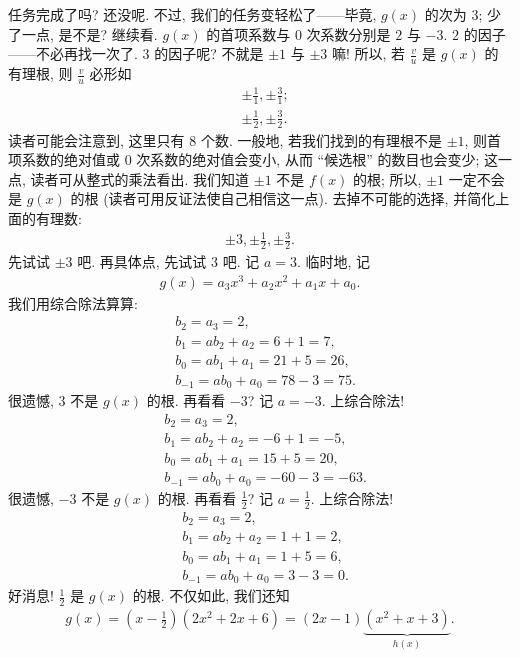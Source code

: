 \begin{example}
    任务完成了吗? 还没呢. 不过, 我们的任务变轻松了——毕竟, $g(x)$ 的次为 $3$; 少了一点, 是不是? 继续看. $g(x)$ 的首项系数与 $0$ 次系数分别是 $2$ 与 $-3$. $2$ 的因子——不必再找一次了. $3$ 的因子呢? 不就是 $\pm 1$ 与 $\pm 3$ 嘛! 所以, 若 $\frac{v}{u}$ 是 $g(x)$ 的有理根, 则 $\frac{v}{u}$ 必形如
    \begin{align*}
         & {\pm \frac{1}{1}}, {\pm \frac{3}{1}}; \\
         & {\pm \frac{1}{2}}, {\pm \frac{3}{2}}.
    \end{align*}
    读者可能会注意到, 这里只有 $8$ 个数. 一般地, 若我们找到的有理根不是 $\pm 1$, 则首项系数的绝对值或 $0$ 次系数的绝对值会变小, 从而 ``候选根'' 的数目也会变少; 这一点, 读者可从整式的乘法看出. 我们知道 $\pm 1$ 不是 $f(x)$ 的根; 所以, $\pm 1$ 一定不会是 $g(x)$ 的根 (读者可用反证法使自己相信这一点). 去掉不可能的选择, 并简化上面的有理数:
    \begin{align*}
        \pm 3, \pm \frac{1}{2}, \pm \frac{3}{2}.
    \end{align*}
    先试试 $\pm 3$ 吧. 再具体点, 先试试 $3$ 吧. 记 $a = 3$. 临时地, 记
    \begin{align*}
        g(x) = a_3 x^3 + a_2 x^2 + a_1 x + a_0.
    \end{align*}
    我们用综合除法算算:
    \begin{align*}
         & b_2 = a_3 = 2,                      \\
         & b_1 = a b_2 + a_2 = 6 + 1 = 7,      \\
         & b_0 = a b_1 + a_1 = 21 + 5 = 26,    \\
         & b_{-1} = a b_0 + a_0 = 78 - 3 = 75.
    \end{align*}
    很遗憾, $3$ 不是 $g(x)$ 的根. 再看看 $-3$? 记 $a = -3$. 上综合除法!
    \begin{align*}
         & b_2 = a_3 = 2,                        \\
         & b_1 = a b_2 + a_2 = -6 + 1 = -5,      \\
         & b_0 = a b_1 + a_1 = 15 + 5 = 20,      \\
         & b_{-1} = a b_0 + a_0 = -60 - 3 = -63.
    \end{align*}
    很遗憾, $-3$ 不是 $g(x)$ 的根. 再看看 $\frac{1}{2}$? 记 $a = \frac{1}{2}$. 上综合除法!
    \begin{align*}
         & b_2 = a_3 = 2,                    \\
         & b_1 = a b_2 + a_2 = 1 + 1 = 2,    \\
         & b_0 = a b_1 + a_1 = 1 + 5 = 6,    \\
         & b_{-1} = a b_0 + a_0 = 3 - 3 = 0.
    \end{align*}
    好消息! $\frac{1}{2}$ 是 $g(x)$ 的根. 不仅如此, 我们还知
    \begin{align*}
        g(x) = \left(x - \frac{1}{2}\right) (2x^2 + 2x + 6) = (2x - 1) \underbrace{(x^2 + x + 3)}_{h(x)}.
    \end{align*}


\end{example}

